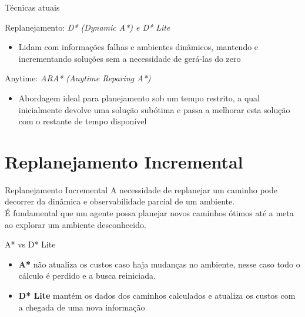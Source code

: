\documentclass[10pt]{beamer}
\begin{document}
\begin{frame}{Técnicas atuais}
\begin{exampleblock}{Replanejamento: \textit{D* (Dynamic A*) e \textit{D* Lite}}}
\begin{itemize}
\item Lidam com informações falhas e ambientes dinâmicos, mantendo e incrementando soluções sem a necessidade de gerá-las do zero
\end{itemize}
\end{exampleblock}
\vspace{0.5cm}
\begin{exampleblock}{Anytime: \textit{ARA* (Anytime Reparing A*)}}
\begin{itemize}
\item Abordagem ideal para planejamento sob um tempo restrito, a qual inicialmente devolve uma solução subótima e passa a melhorar esta solução com o restante de tempo disponível
\end{itemize}
\end{exampleblock}
\end{frame}

\section{Replanejamento Incremental}

\begin{frame}{Replanejamento Incremental}
A necessidade de replanejar um caminho pode decorrer da dinâmica e observabilidade parcial de um ambiente. \\
\newline É fundamental que um agente possa planejar novos caminhos ótimos até a meta ao explorar um ambiente desconhecido.
\vspace{0.3cm}
\begin{exampleblock}{A* vs D* Lite}
\begin{itemize}
\item[] \textbf{A*} não atualiza os custos caso haja mudanças no ambiente, nesse caso todo o cálculo é perdido e a busca reiniciada.
\item[] \textbf{D* Lite} mantém os dados dos caminhos calculados e atualiza os custos com a chegada de uma nova informação
\end{itemize}
\end{exampleblock} 
\end{frame}
\end{document}
